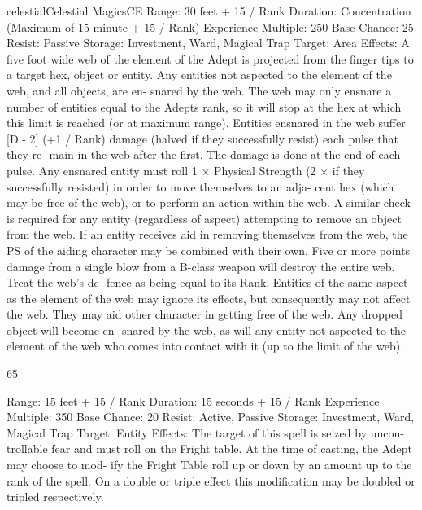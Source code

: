 \begin{College}[1.3]{celestial}{Celestial Magics}{CE}
Range: 30 feet + 15 / Rank 
Duration:  Concentration  (Maximum  of  15  minute 
+ 15 / Rank) 
Experience Multiple: 250 
Base Chance: 25%
Resist: Passive 
Storage: Investment, Ward, Magical Trap 
Target: Area 
Effects: A five foot wide web of the element of the 
Adept  is  projected  from  the  finger  tips  to  a  target 
hex,  object  or  entity.  Any  entities  not  aspected  to 
the  element  of  the  web,  and  all  objects,  are  en-
snared  by  the  web.  The  web  may  only  ensnare  a 
number  of  entities  equal  to  the  Adepts  rank,  so  it 
will  stop  at  the  hex  at  which  this  limit  is  reached 
(or  at  maximum  range).  Entities  ensnared  in  the 
web  suffer  [D  -  2]  (+1  /  Rank)  damage  (halved  if 
they  successfully  resist)  each  pulse  that  they  re-
main in the web after the first. The damage is done 
at the end of each pulse. Any ensnared entity must 
roll 1 × Physical Strength (2 × if they successfully 
resisted)  in  order  to  move  themselves  to  an  adja-
cent  hex  (which  may  be  free  of  the  web),  or  to 
perform an action within the web. A similar check 
is  required  for  any  entity  (regardless  of  aspect) 
attempting to remove an object from the web. If an 
entity  receives  aid  in  removing  themselves  from 
the  web,  the  PS  of  the  aiding  character  may  be 
combined  with  their  own.  Five  or  more  points 
damage from a single blow from a B-class weapon 
will  destroy  the  entire  web.  Treat  the  web’s  de-
fence  as  being  equal  to  its  Rank.  Entities  of  the 
same aspect as the element of the web may ignore 
its  effects,  but  consequently  may  not  affect  the 
web.  They  may  aid  other  character  in  getting  free 
of  the  web.  Any  dropped  object  will  become  en-
snared by  the  web,  as  will  any  entity  not  aspected 
to  the  element  of  the  web  who  comes  into  contact 
with it (up to the limit of the web). 

65 

Range: 15 feet + 15 / Rank 
Duration: 15 seconds + 15 / Rank 
Experience Multiple: 350 
Base Chance: 20%
Resist: Active, Passive 
Storage: Investment, Ward, Magical Trap 
Target: Entity 
Effects: The target of this spell is seized by uncon-
trollable  fear  and  must  roll  on  the  Fright  table.  At 
the time of casting, the Adept may choose to mod-
ify the Fright Table roll up or down by an amount 
up  to  the  rank  of  the  spell.  On  a  double  or  triple 
effect  this  modification  may  be  doubled  or  tripled 
respectively. 


\end{College}
